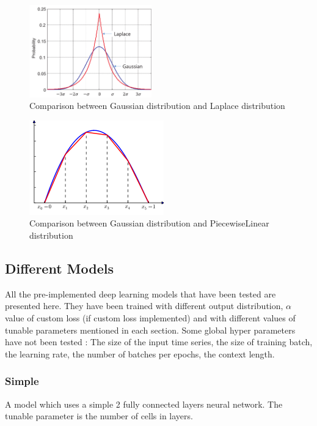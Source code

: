 \documentclass[a4paper, 12pt]{article}
\begin{document}
\begin{figure}
    \centering
    \includegraphics[width=200px]{Gaussian-distribution-and-Laplace-distribution.ppm.png}
    \caption{Comparison between Gaussian distribution and Laplace distribution}
    \label{fig:gausslaplace}
\end{figure}

\begin{figure}
    \centering
    \includegraphics{220px-Finite_element_method_1D_illustration1.svg.png}
    \caption{Comparison between Gaussian distribution and PiecewiseLinear distribution}
    \label{fig:gausslaplace}
\end{figure}

\subsection{Different Models} \label{diff_models}


All the pre-implemented deep learning models that have been tested  are presented here.
They have been trained with different output distribution, $\alpha$ value of custom loss (if custom loss implemented) and with different values of tunable parameters mentioned in each section.
Some global hyper parameters have not been tested : The size of the input time series, the size of training batch, the learning rate, the number of batches per epochs, the context length.



\subsubsection{Simple} \label{descr_simple}
A model which uses a simple 2 fully connected layers neural network.
The tunable parameter is the number of cells in layers.
\end{document}
